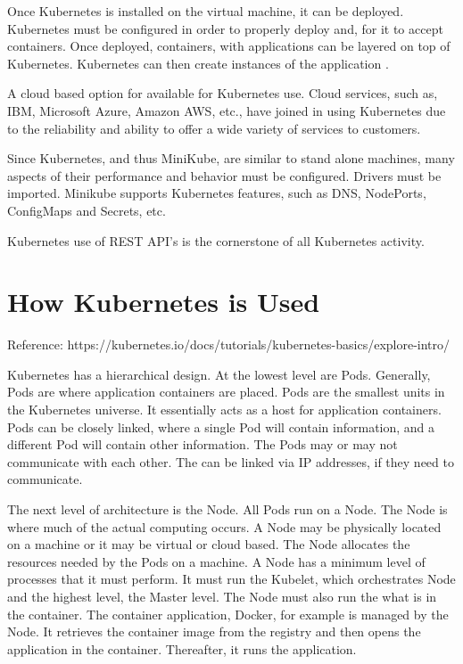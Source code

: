 \documentclass[12pt, letterpaper]{article}
\begin{document}
Once Kubernetes is installed on the virtual machine, it can be deployed.  Kubernetes must be configured in order to properly deploy and, for it to accept containers.  Once deployed, containers, with applications can be layered on top of Kubernetes.  Kubernetes can then create instances of the application  \cite{hid-sp18-525-concept}.

A cloud based option for available for Kubernetes use.  Cloud services, such as, IBM, Microsoft Azure, Amazon AWS, etc., have joined in using Kubernetes due to the reliability and ability to offer a wide variety of services to customers.  

Since Kubernetes, and thus MiniKube, are similar to stand alone machines, many aspects of their performance and behavior must be configured.  Drivers must be imported.  Minikube supports Kubernetes features, such as DNS, NodePorts, ConfigMaps and Secrets, etc.  

Kubernetes use of REST API's is the cornerstone of all Kubernetes activity.  


\section *{How Kubernetes is Used}
\setlength{\parskip}{1.6em}
Reference:  https://kubernetes.io/docs/tutorials/kubernetes-basics/explore-intro/

Kubernetes has a hierarchical design.  At the lowest level are Pods.  Generally, Pods are where application containers are placed.  Pods are the smallest units in the Kubernetes universe.  It essentially acts as a host for application containers.  Pods can be closely linked, where a single Pod will contain information, and a different Pod will contain other information.  The Pods may or may not communicate with each other.  The can be linked via IP addresses, if they need to communicate.  

The next level of architecture is the Node.  All Pods run on a Node.  The Node is where much of the actual computing occurs.  A Node may be physically located on a machine or it may be virtual or cloud based. The Node allocates the resources needed by the Pods on a machine.  A Node has a minimum level of processes that it must perform.  It must run the Kubelet, which orchestrates Node and the highest level, the Master level.  The Node must also run the what is in the container.  The container application, Docker, for example is managed by the Node.  It retrieves the container image from the registry and then opens the application in the container.  Thereafter, it runs the application.
\end{document}
